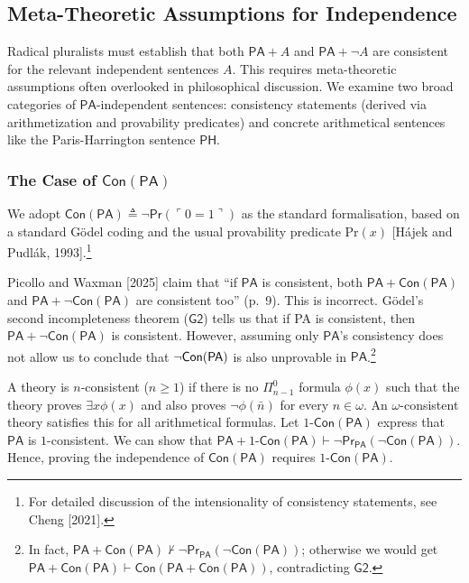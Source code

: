 \documentclass[a4paper,12pt]{amsart}
\theoremstyle{definition}
\numberwithin{equation}{section}
\begin{document}
\subsection{Meta-Theoretic Assumptions for Independence}

Radical pluralists must establish that both $\mathsf{PA}+A$ and 
$\mathsf{PA}+\neg A$ are consistent for the relevant independent 
sentences $A$. This requires meta-theoretic assumptions often 
overlooked in philosophical discussion. We examine two broad categories of \(\mathsf{PA}\)-independent sentences: consistency statements (derived via 
arithmetization and provability predicates) and concrete arithmetical 
sentences like the Paris-Harrington sentence \(\mathsf{PH}\).
 
 
\subsubsection{The Case of $\mathsf{Con}(\mathsf{PA})$}

We adopt \(\mathsf{Con}(\mathsf{PA}) \triangleq \neg \mathsf{Pr}(\ulcorner 0=1 \urcorner)\) 
as the standard formalisation, based on a standard G\"odel coding and 
the usual provability predicate $\mathrm{Pr}(x)$ [H\'ajek and Pudl\'ak, 1993].\footnote{For detailed discussion of the intensionality of consistency statements, see Cheng [2021].}
          
Picollo and Waxman  [2025] claim that ``if \(\mathsf{PA}\) is consistent, both \(\mathsf{PA}+\mathsf{Con(PA)}\) and \(\mathsf{PA}+\neg\mathsf{Con(PA)}\) are consistent too'' (p.~9). This is incorrect. Gödel's second incompleteness theorem ($\mathsf{G2}$) tells us that if {\sf PA} is consistent, then \(\mathsf{PA}+\neg\mathsf{Con(PA)}\) is consistent.  However, 
assuming only $\mathsf{PA}$'s consistency does not allow us to conclude that 
$\neg \sf Con(PA)$ is also  unprovable in $\mathsf{PA}$.\footnote{In fact, \(\mathsf{PA}+\mathsf{Con(PA)}\nvdash \neg\mathsf{Pr}_{\mathsf{PA}}(\neg\mathsf{Con(PA)})\); otherwise we would get \(\mathsf{PA}+\mathsf{Con(PA)}\vdash \mathsf{Con}(\mathsf{PA}+\mathsf{Con(PA)})\), contradicting \(\mathsf{G2}\).}
 
A theory is $n$-consistent ($n\ge 1$) if there is no $\Pi_{n-1}^0$ 
formula $\phi(x)$ such that the theory proves $\exists x\phi(x)$ and 
also proves $\neg\phi(\bar{n})$ for every $n\in\omega$. An 
$\omega$-consistent theory satisfies this for all arithmetical 
formulas. Let \(1\)-\(\mathsf{Con(PA)}\) express that \(\mathsf{PA}\) is \(1\)-consistent. We can show that \(\mathsf{PA}+1\)-\(\mathsf{Con(PA)}\vdash \neg\mathsf{Pr}_{\mathsf{PA}}(\neg\mathsf{Con(PA)})\). Hence, proving the independence of \(\mathsf{Con(PA)}\) requires \(1\)-\(\mathsf{Con(PA)}\).
\end{document}
